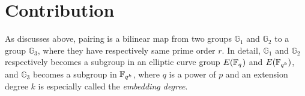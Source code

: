 %






\section{Contribution}
\label{ch1_sec_contribution}
As discusses above, pairing is a bilinear map from two groups $\mathbb{G}_1$ and $\mathbb{G}_2$ to a group $\mathbb{G}_3$, where they have respectively same prime order $r$.
In detail, $\mathbb{G}_1$ and $\mathbb{G}_2$ respectively becomes a subgroup in an elliptic curve group $E({\mathbb{F}}_{q^{}})$ and $E({\mathbb{F}}_{q^{k}})$, and $\mathbb{G}_3$ becomes a subgroup in ${\mathbb{F}}_{q^{k}}$, where $q$ is a power of $p$ and an extension degree $k$ is especially called the {\it embedding degree}.

